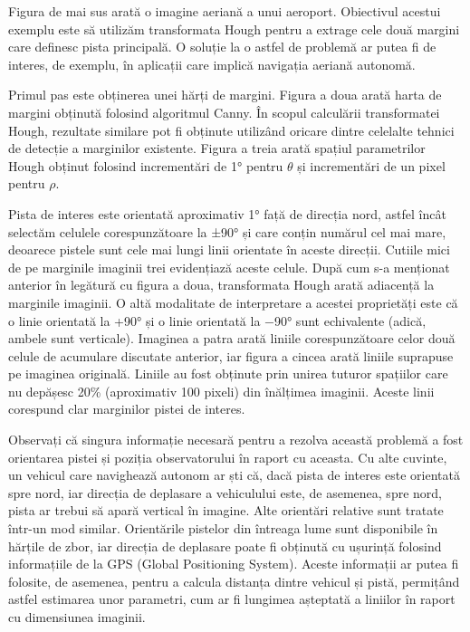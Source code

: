 \documentclass[a4paper,12pt]{report}
\begin{document}
Figura de mai sus arată o imagine aeriană a unui aeroport. Obiectivul acestui exemplu este să utilizăm transformata Hough pentru a extrage cele două margini care definesc pista principală. O soluție la o astfel de problemă ar putea fi de interes, de exemplu, în aplicații care implică navigația aeriană autonomă.

Primul pas este obținerea unei hărți de margini. Figura a doua arată harta de margini obținută folosind algoritmul Canny. În scopul calculării transformatei Hough, rezultate similare pot fi obținute utilizând oricare dintre celelalte tehnici de detecție a marginilor existente. Figura a treia arată spațiul parametrilor Hough obținut folosind incrementări de 1° pentru $\theta$ și incrementări de un pixel pentru $\rho$.

Pista de interes este orientată aproximativ 1° față de direcția nord, astfel încât selectăm celulele corespunzătoare la ±90° și care conțin numărul cel mai mare, deoarece pistele sunt cele mai lungi linii orientate în aceste direcții. Cutiile mici de pe marginile imaginii trei evidențiază aceste celule. După cum s-a menționat anterior în legătură cu figura a doua, transformata Hough arată adiacență la marginile imaginii. O altă modalitate de interpretare a acestei proprietăți este că o linie orientată la +90° și o linie orientată la −90° sunt echivalente (adică, ambele sunt verticale). Imaginea a patra arată liniile corespunzătoare celor două celule de acumulare discutate anterior, iar figura a cincea arată liniile suprapuse pe imaginea originală. Liniile au fost obținute prin unirea tuturor spațiilor care nu depășesc 20\% (aproximativ 100 pixeli) din înălțimea imaginii. Aceste linii corespund clar marginilor pistei de interes.

Observați că singura informație necesară pentru a rezolva această problemă a fost orientarea pistei și poziția observatorului în raport cu aceasta. Cu alte cuvinte, un vehicul care navighează autonom ar ști că, dacă pista de interes este orientată spre nord, iar direcția de deplasare a vehiculului este, de asemenea, spre nord, pista ar trebui să apară vertical în imagine. Alte orientări relative sunt tratate într-un mod similar. Orientările pistelor din întreaga lume sunt disponibile în hărțile de zbor, iar direcția de deplasare poate fi obținută cu ușurință folosind informațiile de la GPS (Global Positioning System). Aceste informații ar putea fi folosite, de asemenea, pentru a calcula distanța dintre vehicul și pistă, permițând astfel estimarea unor parametri, cum ar fi lungimea așteptată a liniilor în raport cu dimensiunea imaginii.
\end{document}
